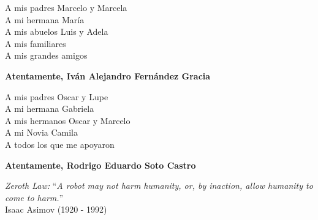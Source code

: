 \thispagestyle{fancy}

\vspace{5cm}

\begin{flushright}
{
{\sc  A mis padres Marcelo y Marcela}\\
{\sc  A mi hermana María}\\
{\sc  A mis abuelos Luis y Adela}\\
{\sc  A mis familiares}\\
{\sc  A mis grandes amigos}\\
}
\end{flushright}
\begin{flushright}
{
{\sc \textbf{Atentamente, Iván Alejandro Fernández Gracia}} \\
}
\end{flushright}

\begin{flushright}
{
{\sc  A mis padres Oscar y Lupe }\\
{\sc  A mi hermana Gabriela }\\
{\sc  A mis hermanos Oscar y Marcelo}\\
{\sc  A mi Novia Camila}\\
{\sc  A todos los que me apoyaron }\\
}
\end{flushright}
\begin{flushright}
{
{\sc \textbf{Atentamente, Rodrigo Eduardo Soto Castro}} \\
}
\end{flushright}







\vfill
\begin{centering}
{{\textit{Zeroth Law:} ``{\it A robot may not harm humanity, or, by inaction, allow humanity to come to harm.}''}\\
{\sc Isaac Asimov (1920 - 1992)}\\}
\end{centering}




